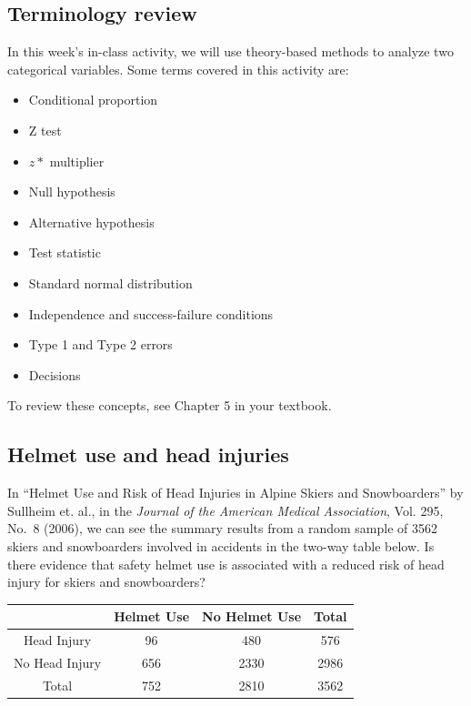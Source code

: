 \documentclass[
]{report}
\begin{document}
\hypertarget{terminology-review-7}{%
\subsection{Terminology review}\label{terminology-review-7}}

In this week's in-class activity, we will use theory-based methods to analyze two categorical variables. Some terms covered in this activity are:

\begin{itemize}
\item
  Conditional proportion
\item
  Z test
\item
  \(z*\) multiplier
\item
  Null hypothesis
\item
  Alternative hypothesis
\item
  Test statistic
\item
  Standard normal distribution
\item
  Independence and success-failure conditions
\item
  Type 1 and Type 2 errors
\item
  Decisions
\end{itemize}

To review these concepts, see Chapter 5 in your textbook.

\hypertarget{helmet-use-and-head-injuries}{%
\subsection{Helmet use and head injuries}\label{helmet-use-and-head-injuries}}

In ``Helmet Use and Risk of Head Injuries in Alpine Skiers and Snowboarders'' by Sullheim et. al., in the \emph{Journal of the American Medical Association}, Vol. 295, No.~8 (2006), we can see the summary results from a random sample of 3562 skiers and snowboarders involved in accidents in the two-way table below. Is there evidence that safety helmet use is associated with a reduced risk of head injury for skiers and snowboarders?

\begin{longtable}[]{@{}cccc@{}}
\toprule
& Helmet Use & No Helmet Use & Total\tabularnewline
\midrule
\endhead
Head Injury & 96 & 480 & 576\tabularnewline
No Head Injury & 656 & 2330 & 2986\tabularnewline
Total & 752 & 2810 & 3562\tabularnewline
\bottomrule
\end{longtable}
\end{document}
